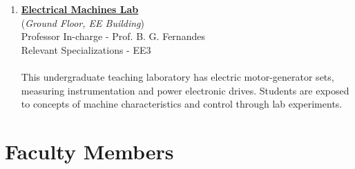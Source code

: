 \documentclass[openany]{book} %
\begin{document}
\begin{enumerate}
\item \href{http://www.ee.iitb.ac.in/emlab/} {\color{blue} \textbf{Electrical Machines Lab}}\\
    (\textit{Ground Floor, EE Building})\\
    Professor In-charge - Prof. B. G. Fernandes\\
Relevant Specializations - EE3\\
\\
This undergraduate teaching laboratory has electric motor-generator sets, measuring instrumentation and power electronic drives. Students are exposed to concepts of machine characteristics and control through lab experiments.


\end{enumerate}
\chapter{Faculty Members}
\end{document}
